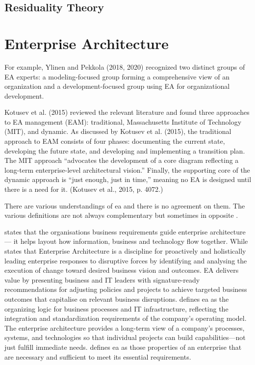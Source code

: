 \subsection{Residuality Theory}
\label{sub:residualitytheory}



\section{Enterprise Architecture}
\label{sec:tbea}

\begin{remark}
For example, Ylinen and Pekkola (2018, 2020) recognized two distinct groups of EA experts: a modeling-focused group forming a comprehensive view of an organization and a development-focused group using EA for organizational development. \parencite[p. 16]{Nurmi2021}

Kotusev et al. (2015) reviewed the relevant literature and found three approaches to EA management (EAM): traditional, Massachusetts Institute of Technology (MIT), and dynamic. As discussed by Kotusev et al. (2015), the traditional approach to EAM consists of four phases: documenting the current state, developing the future state, and developing and implementing a transition plan. The MIT approach “advocates the development of a core diagram reflecting a long-term enterprise-level architectural vision.” Finally, the supporting core of the dynamic approach is “just enough, just in time,” meaning no EA is designed until there is a need for it. (Kotusev et al., 2015, p. 4072.)
\end{remark}

There are various understandings of \acrlong{ea} and there is no agreement on them. The various definitions are not always complementary but sometimes in opposite \parencite{Lapalme2012,SaintLouis2019,Hoogervorst2009}.

\textcite{White2018} states that the organisations business requirements guide enterprise architecture — it helps layout how information, business and technology flow together. While \textcite{Gartner} states that Enterprise Architecture is a discipline for proactively and holistically leading enterprise responses to disruptive forces by identifying and analysing the execution of change toward desired business vision and outcomes. EA delivers value by presenting business and IT leaders with signature-ready recommendations for adjusting policies and projects to achieve targeted business outcomes that capitalise on relevant business disruptions. \textcite[p. 9]{Ross2014} defines \acrshort{ea} as the organizing logic for business processes and IT infrastructure, reflecting the integration and standardization requirements of the company’s operating model. The enterprise architecture provides a long-term view of a company’s processes, systems, and technologies so that individual projects can build capabilities—not just fulfill immediate needs. \textcite[p. 24]{Greefhorst2011} defines \acrshort{ea} as those properties of an enterprise that are necessary and sufficient to meet its essential requirements.

